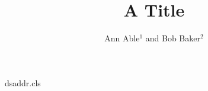 \begin{filecontents*}[overwrite]{dsaddr.cls}
\newif\ifds@split
\newcommand{\address}[1]{\gdef\ds@address{#1\ifds@split\relax\fi}}
\let\ds@address\empty
\def\@maketitle{\begin{center}{\LARGE\@title\par}\vskip1em{\large\@author\par}\vskip1em
  \ifx\ds@address\empty\else{\small\ds@address\par}\fi\end{center}}
\end{filecontents*}
\documentclass{dsaddr}

\title{A Title}
\author{Ann Able$^{1}$ and Bob Baker$^{2}$}
\address{$^{1}$Univ A, Town\\ $^{2}$Univ B, City\\ Internet: ann@a.edu}
\maketitle
Text.


